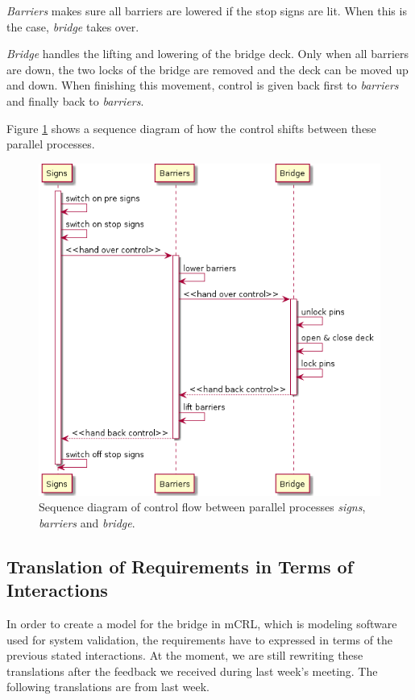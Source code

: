 \documentclass{article}
\begin{document}
\emph{Barriers} makes sure all barriers are lowered if the stop signs are lit. When this is the case, \emph{bridge} takes over.

\emph{Bridge} handles the lifting and lowering of the bridge deck. Only when all barriers are down, the two locks of the bridge are removed and the deck can be moved up and down. When finishing this movement, control is given back first to \emph{barriers} and finally back to \emph{barriers}.

Figure \ref{fig:arch} shows a sequence diagram of how the control shifts between these parallel processes.
%
\begin{figure}%
\centering
\includegraphics[width=0.5\columnwidth]{Architecture}%
\caption{Sequence diagram of control flow between parallel processes \emph{signs}, \emph{barriers} and \emph{bridge}.}%
\label{fig:arch}%
\end{figure}

\subsection{Translation of Requirements in Terms of Interactions}

In order to create a model for the bridge in mCRL, which is modeling software used for system validation, the requirements have to expressed in terms of the previous stated interactions. At the moment, we are still rewriting these translations after the feedback we received during last week's meeting. The following translations are from last week.
\end{document}
